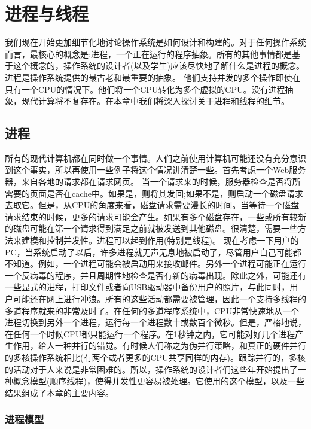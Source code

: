 \chapter{进程与线程}
\thispagestyle{empty}

	我们现在开始更加细节化地讨论操作系统是如何设计和构建的。对于任何操作系统而言，最核心的概念是:进程，一个正在运行的程序抽象。所有的其他事情都是基于这个概念的，操作系统的设计者(以及学生)应该尽快地了解什么是进程的概念。进程是操作系统提供的最古老和最重要的抽象。
	他们支持并发的多个操作即使在只有一个CPU的情况下。他们将一个CPU转化为多个虚拟的CPU。没有进程抽象，现代计算将不复存在。在本章中我们将深入探讨关于进程和线程的细节。
	
	\section{进程}
	
	所有的现代计算机都在同时做一个事情。人们之前使用计算机可能还没有充分意识到这个事实，所以再使用一些例子将这个情况讲清楚一些。首先考虑一个Web服务器，来自各地的请求都在请求网页。
	当一个请求来的时候，服务器检查是否将所需要的页面是否在cache中。如果是，则将其发回;如果不是，则启动一个磁盘请求去取它。但是，从CPU的角度来看，磁盘请求需要漫长的时间。当等待一个磁盘请求结束的时候，更多的请求可能会产生。如果有多个磁盘存在，一些或所有较新的磁盘可能在第一个请求得到满足之前就被发送到其他磁盘。很清楚，需要一些方法来建模和控制并发性。进程可以起到作用(特别是线程)。
	现在考虑一下用户的PC，当系统启动了以后，许多进程就无声无息地被启动了，尽管用户自己可能都不知道。例如，一个进程可能会被启动用来接收邮件。另外一个进程可能正在运行一个反病毒的程序，并且周期性地检查是否有新的病毒出现。除此之外，可能还有一些显式的进程，打印文件或者向USB驱动器中备份用户的照片，与此同时，用户可能还在网上进行冲浪。所有的这些活动都需要被管理，因此一个支持多线程的多道程序就来的非常及时了。在任何的多道程序系统中，CPU非常快速地从一个进程切换到另外一个进程，运行每一个进程数十或数百个微秒。但是，严格地说，在任何一个时候CPU都只能运行一个程序。在1秒钟之内，它可能对好几个进程产生作用，给人一种并行的错觉。有时候人们称之为伪并行策略，和真正的硬件并行的多核操作系统相比(有两个或者更多的CPU共享同样的内存)。跟踪并行的，多核的活动对于人来说是非常困难的。所以，操作系统的设计者们这些年开始提出了一种概念模型(顺序线程)，使得并发性更容易被处理。它使用的这个模型，以及一些结果组成了本章的主要内容。
	
	\subsection{进程模型}
	
